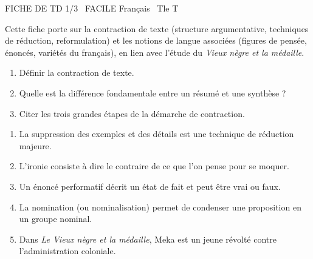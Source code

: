 \documentclass[11pt]{article}
\begin{document}
\begin{tcolorbox}[enhanced,colback=popink,colframe=popink,arc=10pt,boxrule=0pt,left=12pt,right=12pt,top=9pt,bottom=9pt]
{\color{white}\popxbold\small FICHE DE TD 1/3 \textbullet\ FACILE \hfill Français \textbullet\ Tle T\par}
\end{tcolorbox}
\vspace{4pt}
Cette fiche porte sur la contraction de texte (structure argumentative, techniques de réduction, reformulation) et les notions de langue associées (figures de pensée, énoncés, variétés du français), en lien avec l'étude du \textit{Vieux nègre et la médaille}.

\begin{exercice}
\begin{enumerate}
    \item Définir la contraction de texte.
    \item Quelle est la différence fondamentale entre un résumé et une synthèse ?
    \item Citer les trois grandes étapes de la démarche de contraction.
\end{enumerate}
\end{exercice}

\begin{exercice}
\begin{enumerate}
    \item La suppression des exemples et des détails est une technique de réduction majeure.
    \item L'ironie consiste à dire le contraire de ce que l'on pense pour se moquer.
    \item Un énoncé performatif décrit un état de fait et peut être vrai ou faux.
    \item La nomination (ou nominalisation) permet de condenser une proposition en un groupe nominal.
    \item Dans \textit{Le Vieux nègre et la médaille}, Meka est un jeune révolté contre l'administration coloniale.
\end{enumerate}
\end{exercice}
\end{document}
